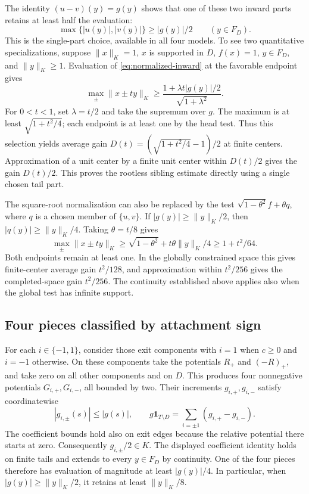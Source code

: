 The identity $(u-v)(y)=g(y)$ shows that one of these two inward parts
retains at least half the evaluation:
\[
 \max\{|u(y)|,|v(y)|\}\ge |g(y)|/2\qquad(y\in F_D).
\]
This is the single-part choice, available in all four models. To see two
quantitative specializations,
suppose $\|x\|_K=1$, $x$ is supported in $D$, $f(x)=1$,
$y\in F_D$, and $\|y\|_K\ge1$. Evaluation of
\eqref{eq:normalized-inward} at the favorable endpoint gives
\[
 \max_{\pm}\|x\pm ty\|_K
 \ge\frac{1+\lambda t|g(y)|/2}{\sqrt{1+\lambda^2}}.
\]
For $0<t<1$, set $\lambda=t/2$ and take the supremum over $g$.
The maximum is at least $\sqrt{1+t^2/4}$; each endpoint is at least
one by the head test. Thus this selection yields average gain
$D(t)=(\sqrt{1+t^2/4}-1)/2$ at finite centers. Approximation of a
unit center by a finite unit center within $D(t)/2$ gives the gain
$D(t)/2$. This proves the rootless sibling estimate directly using a
single chosen tail part.

The square-root normalization can also be replaced by the test
$\sqrt{1-\theta^2}f+\theta q$, where $q$ is a chosen member of
$\{u,v\}$. If $|g(y)|\ge\|y\|_K/2$, then
$|q(y)|\ge\|y\|_K/4$. Taking $\theta=t/8$ gives
\[
 \max_{\pm}\|x\pm ty\|_K
 \ge\sqrt{1-\theta^2}+t\theta\|y\|_K/4
 \ge1+t^2/64.
\]
Both endpoints remain at least one. In the globally constrained space
this gives finite-center average gain $t^2/128$, and approximation
within $t^2/256$ gives the completed-space gain $t^2/256$.
The continuity established above applies also when the global test has
infinite support.

\subsection{Four pieces classified by attachment sign}
\label{sec:four-piece-selection}

For each $i\in\{-1,1\}$, consider those exit components with
$i=1$ when $c\ge0$ and $i=-1$ otherwise. On these components take
the potentials $R_+$ and $(-R)_+$, and take zero on all other
components and on $D$. This produces four nonnegative potentials
$G_{i,+},G_{i,-}$, all bounded by two. Their increments
$g_{i,+},g_{i,-}$ satisfy coordinatewise
\[
 |g_{i,\pm}(s)|\le |g(s)|,
 \qquad g\mathbf1_{T\setminus D}
       =\sum_{i=\pm1}(g_{i,+}-g_{i,-}).
\]
The coefficient bounds hold also on exit edges because the relative
potential there starts at zero. Consequently $g_{i,\pm}/2\in K$.
The displayed coefficient identity holds on finite tails and extends
to every $y\in F_D$ by continuity. One of the four pieces therefore
has evaluation of magnitude at least $|g(y)|/4$. In particular, when
$|g(y)|\ge\|y\|_K/2$, it retains at least $\|y\|_K/8$.

